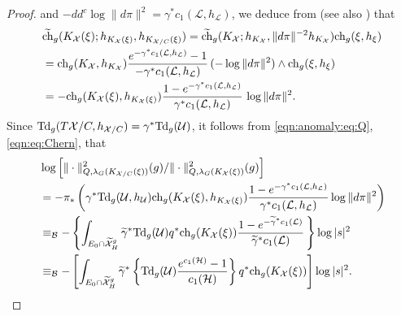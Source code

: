 \documentclass[amscd, leqno]{amsart}
\theoremstyle{plain}
\theoremstyle{definition}
\theoremstyle{remark}
\newenvironment{pf}{\begin{proof}}{\end{proof}}
\begin{document}
\begin{pf}
and $-dd^{c}\log\|d\pi\|^{2}=\gamma^{*}c_{1}({\mathcal L},h_{\mathcal L})$, 
we deduce from \cite[I, (1.2.5.1), (1.3.1.2)]{GilletSoule90} (see also \cite[Eqs.\,(3.7), (5.5)]{FLY08}) that
\begin{equation}
\label{eqn:eq:Chern}
\begin{aligned}
\,&
\widetilde{{\rm ch}}_{g}(K_{\mathcal X}(\xi);h_{K_{\mathcal X}(\xi)},h_{K_{{\mathcal X}/C}(\xi)})
=
\widetilde{{\rm ch}}_{g}(K_{\mathcal X};h_{K_{\mathcal X}},\|d\pi\|^{-2}h_{K_{\mathcal X}}) {\rm ch}_{g}(\xi,h_{\xi})
\\
&=
{\rm ch}_{g}(K_{\mathcal X},h_{K_{\mathcal X}})
\frac{e^{-\gamma^{*}c_{1}({\mathcal L},h_{\mathcal L})}-1}{-\gamma^{*}c_{1}({\mathcal L},h_{\mathcal L})}\,
(-\log\|d\pi\|^{2}) \wedge {\rm ch}_{g}(\xi,h_{\xi})
\\
&=
-{\rm ch}_{g}(K_{\mathcal X}(\xi),h_{K_{\mathcal X}(\xi)}) 
\frac{1-e^{-\gamma^{*}c_{1}({\mathcal L},h_{\mathcal L})}}{\gamma^{*}c_{1}({\mathcal L},h_{\mathcal L})}\,
\log\|d\pi\|^{2}.
\end{aligned}
\end{equation}
Since ${\rm Td}_{g}(T{\mathcal X}/C, h_{{\mathcal X}/C})=\gamma^{*}{\rm Td}_{g}({\mathcal U})$, 
it follows from \eqref{eqn:anomaly:eq:Q}, \eqref{eqn:eq:Chern}, \cite[Cor.\,4.6]{Yoshikawa07} that
\begin{equation}
\label{eqn:ratio:eq:Q}
\begin{aligned}
\,&
\log \left[ \|\cdot\|^{2}_{Q,\lambda_{G}(K_{{\mathcal X}/C}(\xi))}(g) / \|\cdot\|^{2}_{Q,\lambda_{G}(K_{\mathcal X}(\xi))}(g) \right]
\\
&=
-\pi_{*}\left( 
\gamma^{*}{\rm Td}_{g}({\mathcal U}, h_{\mathcal U}) {\rm ch}_{g}(K_{\mathcal X}(\xi), h_{K_{\mathcal X}(\xi)}) 
\frac{1-e^{-\gamma^{*}c_{1}({\mathcal L},h_{\mathcal L})}}{\gamma^{*}c_{1}({\mathcal L},h_{\mathcal L})} \log \| d\pi \|^{2}
\right)
\\
&\equiv_{\mathcal B}
-\left\{
\int_{E_{0}\cap\widetilde{\mathcal X}_{H}^{g}}
\widetilde{\gamma}^{*}{\rm Td}_{g}({\mathcal U})q^{*}{\rm ch}_{g}(K_{\mathcal X}(\xi))
\frac{1-e^{-\widetilde{\gamma}^{*}c_{1}({\mathcal L})}}{\widetilde{\gamma}^{*}c_{1}({\mathcal L})}\,
\right\}
\log|s|^{2}
\\
&\equiv_{\mathcal B}
-\left[
\int_{E_{0}\cap\widetilde{\mathcal X}_{H}^{g}} 
\widetilde{\gamma}^{*}\left\{ {\rm Td}_{g}({\mathcal U})
\frac{e^{c_{1}({\mathcal H})}-1}{c_{1}({\mathcal H})} \right\} q^{*}{\rm ch}_{g}(K_{\mathcal X}(\xi))
\right]
\log|s|^{2}.
\end{aligned}
\end{equation}

\end{pf}
\end{document}
